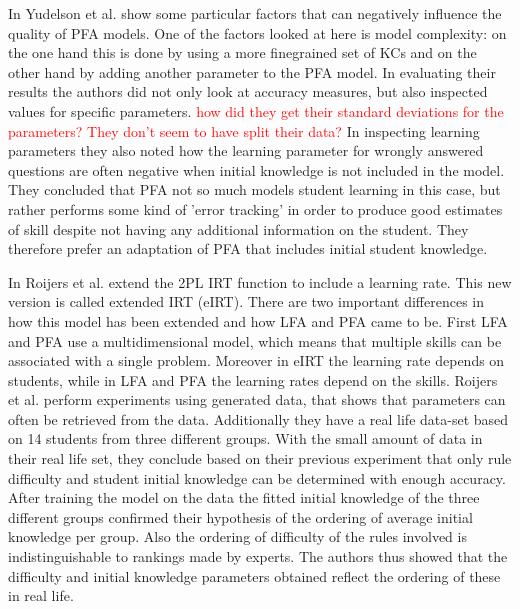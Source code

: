 \documentclass{scrartcl}
\newcommand\todo[1]{\textcolor{red}{#1}}
\begin{document}
In \cite{blackart} Yudelson et al. show some particular factors that can negatively influence the quality of PFA models. One of the factors looked at here is model complexity: on the one hand this is done by using a more finegrained set of KCs and on the other hand by adding another parameter to the PFA model. In evaluating their results the authors did not only look at accuracy measures, but also inspected values for specific parameters. \todo{how did they get their standard deviations for the parameters? They don't seem to have split their data?} In inspecting learning parameters they also noted how the learning parameter for wrongly answered questions are often negative when initial knowledge is not included in the model. They concluded that PFA not so much models student learning in this case, but rather performs some kind of 'error tracking' in order to produce good estimates of skill despite not having any additional information on the student. They therefore prefer an adaptation of PFA that includes initial student knowledge.

In \cite{eirt} Roijers et al. extend the 2PL IRT function to include a learning rate. This new version is called extended IRT (eIRT). There are two important differences in how this model has been extended and how LFA and PFA came to be. First LFA and PFA use a multidimensional model, which means that multiple skills can be associated with a single problem. Moreover in eIRT the learning rate depends on students, while in LFA and PFA the learning rates depend on the skills. Roijers et al. perform experiments using generated data, that shows that parameters can often be retrieved from the data. Additionally they have a real life data-set based on 14 students from three different groups. With the small amount of data in their real life set, they conclude based on their previous experiment that only rule difficulty and student initial knowledge can be determined with enough accuracy. After training the model on the data the fitted initial knowledge of the three different groups confirmed their hypothesis of the ordering of average initial knowledge per group. Also the ordering of difficulty of the rules involved is indistinguishable to rankings made by experts. The authors thus showed that the difficulty and initial knowledge parameters obtained reflect the ordering of these in real life.
\end{document}
